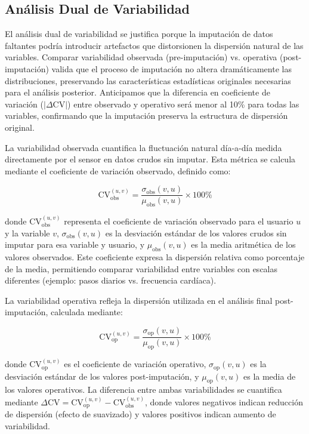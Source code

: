 \subsection{Análisis Dual de Variabilidad}
\label{subsec:variabilidad_dual}

El análisis dual de variabilidad se justifica porque la imputación de datos faltantes podría introducir artefactos que distorsionen la dispersión natural de las variables. Comparar variabilidad observada (pre-imputación) vs. operativa (post-imputación) valida que el proceso de imputación no altera dramáticamente las distribuciones, preservando las características estadísticas originales necesarias para el análisis posterior. Anticipamos que la diferencia en coeficiente de variación ($|\Delta\text{CV}|$) entre observado y operativo será menor al 10\% para todas las variables, confirmando que la imputación preserva la estructura de dispersión original.

La variabilidad observada cuantifica la fluctuación natural día-a-día medida directamente por el sensor en datos crudos sin imputar. Esta métrica se calcula mediante el coeficiente de variación observado, definido como:

\begin{equation}
\text{CV}_{\text{obs}}^{(u,v)} = \frac{\sigma_{\text{obs}}(v, u)}{\mu_{\text{obs}}(v, u)} \times 100\%
\label{eq:cv_observado}
\end{equation}

donde $\text{CV}_{\text{obs}}^{(u,v)}$ representa el coeficiente de variación observado para el usuario $u$ y la variable $v$, $\sigma_{\text{obs}}(v, u)$ es la desviación estándar de los valores crudos sin imputar para esa variable y usuario, y $\mu_{\text{obs}}(v, u)$ es la media aritmética de los valores observados. Este coeficiente expresa la dispersión relativa como porcentaje de la media, permitiendo comparar variabilidad entre variables con escalas diferentes (ejemplo: pasos diarios vs. frecuencia cardíaca).

La variabilidad operativa refleja la dispersión utilizada en el análisis final post-imputación, calculada mediante:

\begin{equation}
\text{CV}_{\text{op}}^{(u,v)} = \frac{\sigma_{\text{op}}(v, u)}{\mu_{\text{op}}(v, u)} \times 100\%
\label{eq:cv_operativo}
\end{equation}

donde $\text{CV}_{\text{op}}^{(u,v)}$ es el coeficiente de variación operativo, $\sigma_{\text{op}}(v, u)$ es la desviación estándar de los valores post-imputación, y $\mu_{\text{op}}(v, u)$ es la media de los valores operativos. La diferencia entre ambas variabilidades se cuantifica mediante $\Delta\text{CV} = \text{CV}_{\text{op}}^{(u,v)} - \text{CV}_{\text{obs}}^{(u,v)}$, donde valores negativos indican reducción de dispersión (efecto de suavizado) y valores positivos indican aumento de variabilidad.

